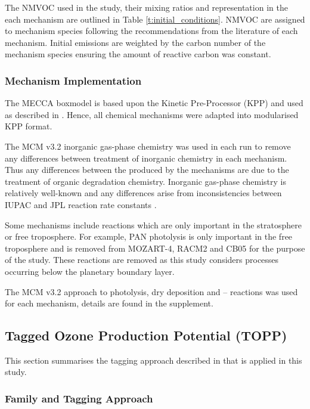 The NMVOC used in the study, their mixing ratios and representation in the each mechanism are outlined in Table \ref{t:initial_conditions}.
NMVOC are assigned to mechanism species following the recommendations from the literature of each mechanism.
Initial emissions are weighted by the carbon number of the mechanism species ensuring the amount of reactive carbon was constant.

\subsubsection{Mechanism Implementation} %

The MECCA boxmodel \citep{Sander:2005} is based upon the Kinetic Pre-Processor (KPP) \citep{Damian:2002} and used as described in \citet{Butler:2011}. 
Hence, all chemical mechanisms were adapted into modularised KPP format.

The MCM v3.2 inorganic gas-phase chemistry was used in each run to remove any differences between treatment of inorganic chemistry in each mechanism.
Thus any differences between the  produced by the mechanisms are due to the treatment of organic degradation chemistry.
Inorganic gas-phase chemistry is relatively well-known and any differences arise from inconsistencies between IUPAC and JPL reaction rate constants \citep{Emmerson:2009}.

Some mechanisms include reactions which are only important in the stratosphere or free troposphere.
For example, PAN photolysis is only important in the free troposphere \citep{Harwood:2003} and is removed from MOZART-4, RACM2 and CB05 for the purpose of the study. 
These reactions are removed as this study considers processes occurring below the planetary boundary layer.

The MCM v3.2 approach to photolysis, dry deposition and -- reactions was used for each mechanism, details are found in the supplement.

\subsection{Tagged Ozone Production Potential (TOPP)}
This section summarises the tagging approach described in \citet{Butler:2011} that is applied in this study.

\subsubsection[Ox Family and Tagging Approach]{ Family and Tagging Approach} \label{ss:tagging} %

